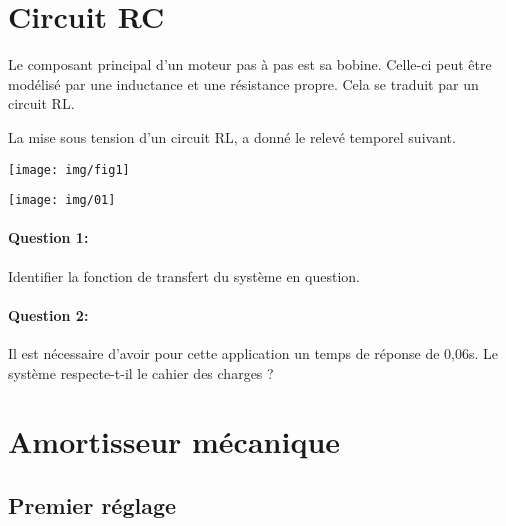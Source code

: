 

\section{Circuit RC}

\begin{minipage}{0.48\linewidth}
Le composant principal d'un moteur pas à pas est sa bobine. Celle-ci peut être modélisé par une inductance et une résistance propre. Cela se traduit par un circuit RL.

La mise sous tension d'un circuit RL, a donné le relevé temporel suivant.
\end{minipage}\hfill
\begin{minipage}{0.48\linewidth}
\begin{center}
 \texttt{[image: img/fig1]}
\end{center}
\end{minipage}

\begin{center}
 \texttt{[image: img/01]}
\end{center}

\paragraph{Question 1:} Identifier la fonction de transfert du système en question.

\paragraph{Question 2:} Il est nécessaire d'avoir pour cette application un temps de réponse de 0,06s. Le système respecte-t-il le cahier des charges ?

\newpage

\section{Amortisseur mécanique}


\subsection{Premier réglage}


